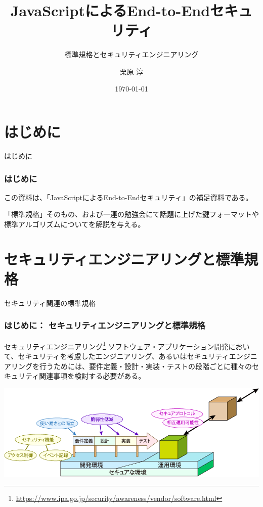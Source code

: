 \documentclass[12pt,dvipdfmx]{beamer}
\title[E2E Security with JS Appendix]{JavaScriptによるEnd-to-Endセキュリティ}
\subtitle{標準規格とセキュリティエンジニアリング}
\author[Jun Kurihara]{栗原 淳}
\institute[]{}
\date[\today]{\today}
\begin{document}
\begin{frame}
\titlepage
\end{frame}

\section{はじめに}
\begin{frame}
 \centering
 {\Large はじめに}
\end{frame}

\begin{frame}
\frametitle{はじめに}
この資料は、「JavaScriptによるEnd-to-Endセキュリティ」の補足資料である。

「標準規格」そのもの、および一連の勉強会にて話題に上げた鍵フォーマットや標準アルゴリズムについてを解説を与える。
\end{frame}

\section{セキュリティエンジニアリングと標準規格}
\begin{frame}
\centering
 {\Large セキュリティ関連の標準規格}
\end{frame}

\begin{frame}
\frametitle{はじめに： セキュリティエンジニアリングと標準規格}
\begin{block}{セキュリティエンジニアリング\footnote[frame]{\scriptsize \url{https://www.ipa.go.jp/security/awareness/vendor/software.html}} }
ソフトウェア・アプリケーション開発において、セキュリティを考慮したエンジニアリング、あるいはセキュリティエンジニアリングを行うためには、要件定義・設計・実装・テストの段階ごとに種々のセキュリティ関連事項を検討する必要がある。
\end{block}
\begin{center}
\includegraphics[width=0.8\linewidth]{FigsAppendix/security-eng-2.png}
\end{center}
\end{frame}
\end{document}
